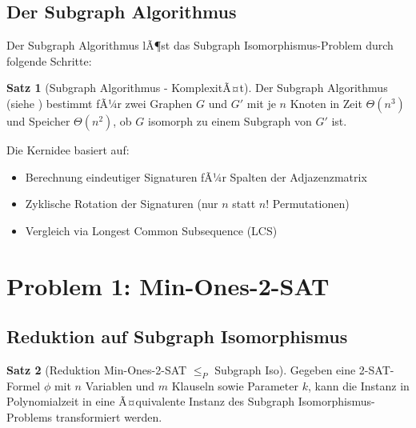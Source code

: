 ﻿\documentclass[a4paper,12pt]{article}
\theoremstyle{definition}
\newtheorem{satz}{Satz}[section]
\begin{document}
\subsection{Der Subgraph Algorithmus}

Der Subgraph Algorithmus lÃ¶st das Subgraph Isomorphismus-Problem durch folgende Schritte:

\begin{satz}[Subgraph Algorithmus - KomplexitÃ¤t]
	Der Subgraph Algorithmus (siehe \cite{subgraph2026}) bestimmt fÃ¼r zwei Graphen $G$ und $G'$ mit je $n$ Knoten in Zeit $\Theta(n^3)$ und Speicher $\Theta(n^2)$, ob $G$ isomorph zu einem Subgraph von $G'$ ist.
\end{satz}

Die Kernidee basiert auf:
\begin{itemize}
	\item Berechnung eindeutiger Signaturen fÃ¼r Spalten der Adjazenzmatrix
	\item Zyklische Rotation der Signaturen (nur $n$ statt $n!$ Permutationen)
	\item Vergleich via Longest Common Subsequence (LCS)
\end{itemize}

\section{Problem 1: Min-Ones-2-SAT}

\subsection{Reduktion auf Subgraph Isomorphismus}

\begin{satz}[Reduktion Min-Ones-2-SAT $\leq_P$ Subgraph Iso]
	Gegeben eine 2-SAT-Formel $\phi$ mit $n$ Variablen und $m$ Klauseln sowie Parameter $k$, kann die Instanz in Polynomialzeit in eine Ã¤quivalente Instanz des Subgraph Isomorphismus-Problems transformiert werden.
\end{satz}
\end{document}
